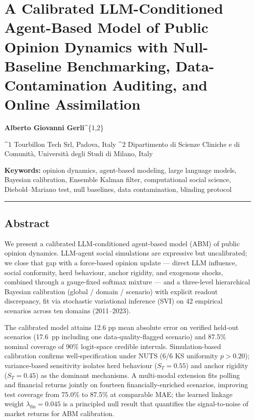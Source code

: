 \documentclass[
]{article}
\author{Alberto Giovanni Gerli\\
Tourbillon Tech Srl, Padova, Italy\\
Università degli Studi di Milano, Italy\\
\texttt{alberto@albertogerli.it}}
\date{May 2026}
\begin{document}
\section{A Calibrated LLM-Conditioned Agent-Based Model of Public
Opinion Dynamics with Null-Baseline Benchmarking, Data-Contamination
Auditing, and Online
Assimilation}\label{a-calibrated-llm-conditioned-agent-based-model-of-public-opinion-dynamics-with-null-baseline-benchmarking-data-contamination-auditing-and-online-assimilation}

\textbf{Alberto Giovanni Gerli}\^{}\{1,2\}

\^{}1 Tourbillon Tech Srl, Padova, Italy \^{}2 Dipartimento di Scienze
Cliniche e di Comunità, Università degli Studi di Milano, Italy

\textbf{Keywords:} opinion dynamics, agent-based modeling, large
language models, Bayesian calibration, Ensemble Kalman filter,
computational social science, Diebold--Mariano test, null baselines,
data contamination, blinding protocol

\begin{center}\rule{0.5\linewidth}{0.5pt}\end{center}

\subsection{Abstract}\label{abstract}

We present a calibrated LLM-conditioned agent-based model (ABM) of
public opinion dynamics. LLM-agent social simulations are expressive but
uncalibrated; we close that gap with a force-based opinion update ---
direct LLM influence, social conformity, herd behaviour, anchor
rigidity, and exogenous shocks, combined through a gauge-fixed softmax
mixture --- and a three-level hierarchical Bayesian calibration (global
/ domain / scenario) with explicit readout discrepancy, fit via
stochastic variational inference (SVI) on 42 empirical scenarios across
ten domains (2011--2023).

The calibrated model attains 12.6 pp mean absolute error on verified
held-out scenarios (17.6~pp including one data-quality-flagged scenario)
and 87.5\% nominal coverage of 90\% logit-space credible intervals.
Simulation-based calibration confirms well-specification under NUTS (6/6
KS uniformity \(p>0.20\)); variance-based sensitivity isolates herd
behaviour (\(S_T=0.55\)) and anchor rigidity (\(S_T=0.45\)) as the
dominant mechanisms. A multi-modal extension fits polling and financial
returns jointly on fourteen financially-enriched scenarios, improving
test coverage from 75.0\% to 87.5\% at comparable MAE; the learned
linkage weight \(\lambda_{\text{fin}}=0.045\) is a principled null
result that quantifies the signal-to-noise of market returns for ABM
calibration.
\end{document}

